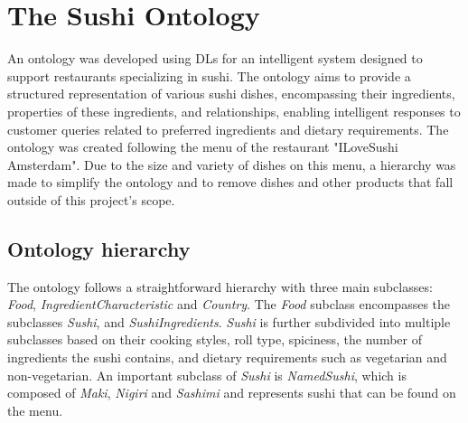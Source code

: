 \documentclass[a4paper]{article}
\theoremstyle{plain}
\theoremstyle{definition}
\begin{document}
    
    \section{The Sushi Ontology}
    \label{sec:intro}
    An ontology was developed using DLs for an intelligent system designed to support restaurants specializing in sushi. The ontology aims to provide a structured representation of various sushi dishes, encompassing their ingredients, properties of these ingredients, and relationships, enabling intelligent responses to customer queries related to preferred ingredients and dietary requirements. The ontology was created following the menu of the restaurant "ILoveSushi Amsterdam". Due to the size and variety of dishes on this menu, a hierarchy was made to simplify the ontology and to remove dishes and other products that fall outside of this project's scope.  

    \subsection{Ontology hierarchy}
    The ontology follows a straightforward hierarchy with three main subclasses: \textit{Food}, \textit{IngredientCharacteristic} and \textit{Country}. The \textit{Food} subclass encompasses the subclasses \textit{Sushi}, and \textit{SushiIngredients}. \textit{Sushi} is further subdivided into multiple subclasses based on their cooking styles, roll type, spiciness, the number of ingredients the sushi contains, and dietary requirements such as vegetarian and non-vegetarian. An important subclass of \textit{Sushi} is \textit{NamedSushi}, which is composed of \textit{Maki}, \textit{Nigiri} and \textit{Sashimi} and represents sushi that can be found on the menu.
    
\end{document}
